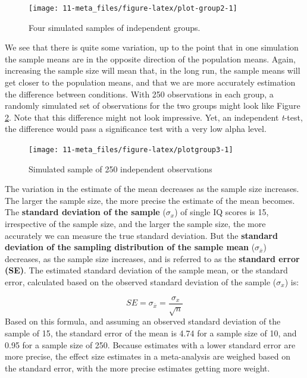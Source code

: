 \documentclass[
  oneside]{book}
\begin{document}
\begin{figure}

{\centering \texttt{[image: 11-meta\_files/figure-latex/plot-group2-1]} 

}

\caption{Four simulated samples of independent groups.}\label{fig:plot-group2}
\end{figure}

We see that there is quite some variation, up to the point that in one simulation the sample means are in the opposite direction of the population means. Again, increasing the sample size will mean that, in the long run, the sample means will get closer to the population means, and that we are more accurately estimation the difference between conditions. With 250 observations in each group, a randomly simulated set of observations for the two groups might look like Figure \ref{fig:plotgroup3}. Note that this difference might not look impressive. Yet, an independent \emph{t}-test, the difference would pass a significance test with a very low alpha level.



\begin{figure}

{\centering \texttt{[image: 11-meta\_files/figure-latex/plotgroup3-1]} 

}

\caption{Simulated sample of 250 independent observations}\label{fig:plotgroup3}
\end{figure}

The variation in the estimate of the mean decreases as the sample size increases. The larger the sample size, the more precise the estimate of the mean becomes. The \textbf{standard deviation of the sample} (\(\sigma_x\)) of single IQ scores is 15, irrespective of the sample size, and the larger the sample size, the more accurately we can measure the true standard deviation. But the \textbf{standard deviation of the sampling distribution of the sample mean} (\(\sigma_{\overline{x}}\)) decreases, as the sample size increases, and is referred to as the \textbf{standard error (SE)}. The estimated standard deviation of the sample mean, or the standard error, calculated based on the observed standard deviation of the sample (\(\sigma_x\)) is:

\[SE = \sigma_{\overline{x}} =  \frac{\sigma_x}{\sqrt{n}}\]
Based on this formula, and assuming an observed standard deviation of the sample of 15, the standard error of the mean is 4.74 for a sample size of 10, and 0.95 for a sample size of 250. Because estimates with a lower standard error are more precise, the effect size estimates in a meta-analysis are weighed based on the standard error, with the more precise estimates getting more weight.
\end{document}
